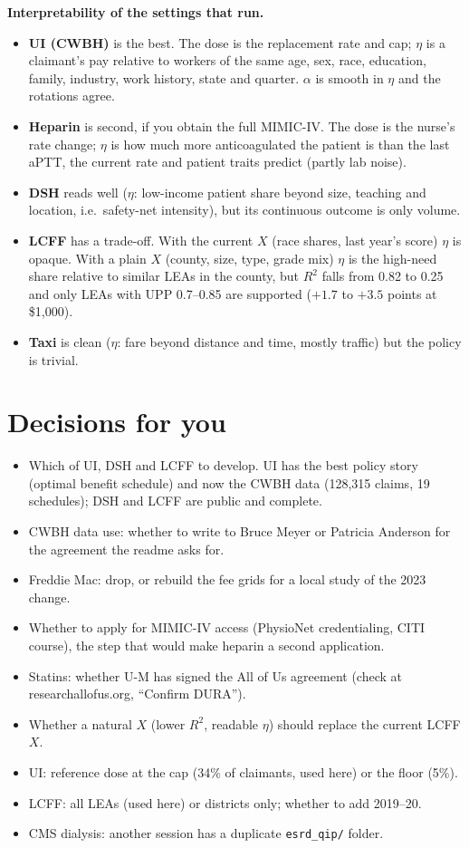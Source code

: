 \documentclass[10pt]{article}
\begin{document}
\textbf{Interpretability of the settings that run.}
\begin{itemize}
\item \textbf{UI (CWBH)} is the best. The dose is the replacement rate and cap; $\eta$ is a
 claimant's pay relative to workers of the same age, sex, race, education, family,
 industry, work history, state and quarter. $\alpha$ is smooth in $\eta$ and the rotations agree.
\item \textbf{Heparin} is second, if you obtain the full MIMIC-IV. The dose is the
 nurse's rate change; $\eta$ is how much more anticoagulated the patient is than the last
 aPTT, the current rate and patient traits predict (partly lab noise).
\item \textbf{DSH} reads well ($\eta$: low-income patient share beyond size, teaching and
 location, i.e.\ safety-net intensity), but its continuous outcome is only volume.
\item \textbf{LCFF} has a trade-off. With the current $X$ (race shares, last year's score)
 $\eta$ is opaque. With a plain $X$ (county, size, type, grade mix) $\eta$ is the high-need
 share relative to similar LEAs in the county, but $R^2$ falls from 0.82 to 0.25 and only
 LEAs with UPP 0.7--0.85 are supported ($+1.7$ to $+3.5$ points at \$1,000).
\item \textbf{Taxi} is clean ($\eta$: fare beyond distance and time, mostly traffic) but the
 policy is trivial.
\end{itemize}

\section*{Decisions for you}
\begin{itemize}
\item Which of UI, DSH and LCFF to develop. UI has the best policy story (optimal benefit
 schedule) and now the CWBH data (128,315 claims, 19 schedules); DSH and LCFF are public and
 complete.
\item CWBH data use: whether to write to Bruce Meyer or Patricia Anderson for the agreement
 the readme asks for.
\item Freddie Mac: drop, or rebuild the fee grids for a local study of the 2023 change.
\item Whether to apply for MIMIC-IV access (PhysioNet credentialing, CITI course), the
 step that would make heparin a second application.
\item Statins: whether U-M has signed the All of Us agreement (check at
 researchallofus.org, ``Confirm DURA'').
\item Whether a natural $X$ (lower $R^2$, readable $\eta$) should replace the current LCFF $X$.
\item UI: reference dose at the cap (34\% of claimants, used here) or the floor (5\%).
\item LCFF: all LEAs (used here) or districts only; whether to add 2019--20.
\item CMS dialysis: another session has a duplicate \texttt{esrd\_qip/} folder.
\end{itemize}
\end{document}
